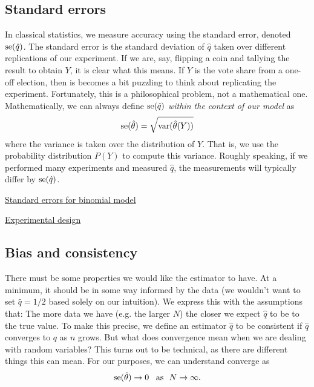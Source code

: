 \subsection{Standard errors}
In classical statistics, we measure accuracy using the standard error, denoted ${\rm se}(\hat{q})$.  The standard error is the standard deviation of $\hat{q}$ taken over different replications of our experiment. If we are, say, flipping a coin and tallying the result to obtain $Y$, it is clear what this means. If $Y$ is the vote share from a one-off election, then is becomes a bit puzzling to think about replicating the experiment. Fortunately, this is a philosophical problem, not a mathematical one. Mathematically, we can always define ${\rm se}(\hat{q})$ \emph{within the context of our model} as 
\begin{equation}
{\rm se}(\hat{\theta}) = \sqrt{{\rm var}(\hat{\theta}(Y))}
\end{equation}
where the variance is taken over the distribution of $Y$. That is, we use the probability distribution $P(Y)$ to compute this variance. 
Roughly speaking, if we performed many experiments and measured $\hat{q}$, the measurements will typically differ by ${\rm se}(\hat{q})$. 

\begin{exercise}
\href{https://colab.research.google.com/drive/1QarJhwPmSqCTQ-HwU_lXCUX6uvdhLdrM#scrollTo=jmB0Mvksc6B_&line=1&uniqifier=1}{Standard errors for binomial model}
\end{exercise} 


\begin{exercise}
\href{https://colab.research.google.com/drive/1QarJhwPmSqCTQ-HwU_lXCUX6uvdhLdrM#scrollTo=crvRJXiBe3r0&line=4&uniqifier=1}{Experimental design}
\end{exercise} 

\subsection{Bias and consistency}


There must be some properties we would like the estimator to have. At a minimum, it should be in some way informed by the data (we wouldn't want to set $\hat{q} = 1/2$ based solely on our intuition). We express this with the assumptions that: The more data we have (e.g. the larger $N$) the closer we expect $\hat{q}$ to be to the true value. To make this precise, we define an estimator $\hat{q}$ to be {\dfn consistent} if $\hat{q}$ converges to $q$ as $n$ grows. But what does convergence mean when we are dealing with random variables? This turns out to be technical, as there are different things this can mean. For our purposes, we can understand converge as 
\begin{equation}
{\rm se}(\hat{\theta})  \to 0 \,\,\,\text{ as }\,\, N\to \infty. 
\end{equation}


